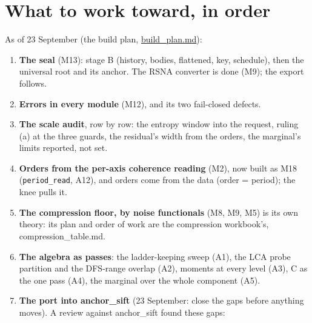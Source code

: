 \section{\texorpdfstring{What to work toward, in order}{What to work toward, in order}}

As of 23 September (the build plan, \hyperref[chap:build-plan]{build\_\allowbreak{}plan.md}):

\begin{enumerate}
\item \textbf{The seal} (M13): stage B (history, bodies, flattened, key, schedule), then the universal root and its anchor. The RSNA converter is done (M9); the export follows.
\item \textbf{Errors in every module} (M12), and its two fail-closed defects.
\item \textbf{The scale audit}, row by row: the entropy window into the request, ruling (a) at the three guards, the residual's width from the orders, the marginal's limits reported, not set.
\item \textbf{Orders from the per-axis coherence reading} (M2), now built as M18 (\texttt{period\_\allowbreak{}read}, A12), and orders come from the data (order = period); the knee pulls it.
\item \textbf{The compression floor, by noise functionals} (M8, M9, M5) is its own theory: its plan and order of work are the compression workbook's, compression\_\allowbreak{}table.md.
\item \textbf{The algebra as passes}: the ladder-keeping sweep (A1), the LCA probe partition and the DFS-range overlap (A2), moments at every level (A3), C as the one pass (A4), the marginal over the whole component (A5).
\item \textbf{The port into anchor\_\allowbreak{}sift} (23 September: close the gaps before anything moves). A review against anchor\_\allowbreak{}sift found these gaps:


\end{enumerate}
